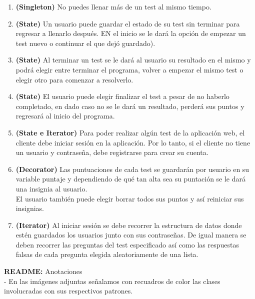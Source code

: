\documentclass{article}
\begin{document}
\begin{enumerate}
    \item \textbf{(Singleton)} No puedes llenar más de un test al mismo tiempo.
    \item \textbf{(State)} Un usuario puede guardar el estado de su test sin terminar para regresar a llenarlo después. EN el inicio se le dará la opción de empezar un test nuevo o continuar el que dejó guardado).
    \item \textbf{(State)} Al terminar un test se le dará al usuario su resultado en el mismo y podrá elegir entre terminar el programa, volver a empezar el mismo test o elegir otro para comenzar a resolverlo.
    \item \textbf{(State)} El usuario puede elegir finalizar el test a pesar de no haberlo completado, en dado caso no se le dará un resultado, perderá sus puntos y regresará al inicio del programa.
    \item \textbf{(State e Iterator)} Para poder realizar algún test de la aplicación web, el cliente debe iniciar sesión en la aplicación. Por lo tanto, si el cliente no tiene un usuario y contraseña, debe registrarse para crear su cuenta.
    \item \textbf{(Decorator)} Las puntuaciones de cada test se guardarán por usuario en su variable puntaje y dependiendo de qué tan alta sea su puntación se le dará una insignia al usuario.\\
    El usuario también puede elegir borrar todos sus puntos y así reiniciar sus insignias.
    \item \textbf{(Iterator)} Al iniciar sesión se debe recorrer la estructura de datos donde estén guardados los usuarios junto con sus contraseñas. De igual manera se deben recorrer las preguntas del test especificado así como las respuestas falsas de cada pregunta elegida aleatoriamente de una lista.
\end{enumerate}

\textbf{README:} Anotaciones\\
- En las imágenes adjuntas señalamos con recuadros de color las clases involucradas con sus respectivos patrones.
\end{document}
